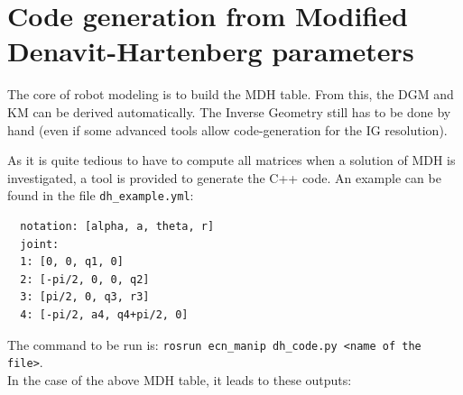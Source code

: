 \documentclass{ecnreport}
\begin{document}
  
  \newpage
  \section{Code generation from Modified Denavit-Hartenberg parameters}\label{dhcode}
  
  The core of robot modeling is to build the MDH table. From this, the DGM and KM can be derived automatically. The Inverse Geometry still has to be done by hand (even if some advanced tools allow code-generation for the IG resolution).
  
  As it is quite tedious to have to compute all matrices when a solution of MDH is investigated, a tool is provided to generate the C++ code. An example can be found in the file \texttt{dh\_example.yml}:
  \cppstyle
  \begin{lstlisting}
  notation: [alpha, a, theta, r]
  joint:
  1: [0, 0, q1, 0]
  2: [-pi/2, 0, 0, q2]
  3: [pi/2, 0, q3, r3]
  4: [-pi/2, a4, q4+pi/2, 0]
  \end{lstlisting}
  The command to be run is: \texttt{rosrun ecn\_manip dh\_code.py <name of the file>}.\\
  In the case of the above MDH table, it leads to these outputs:
  
\end{document}
